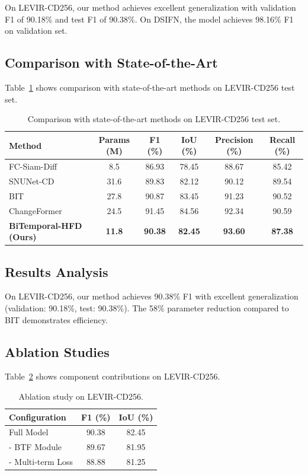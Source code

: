\documentclass{IEEEtran}
\begin{document}
On LEVIR-CD256, our method achieves excellent generalization with validation F1 of 90.18\% and test F1 of 90.38\%. On DSIFN, the model achieves 98.16\% F1 on validation set.

\subsection{Comparison with State-of-the-Art}

Table~\ref{tab:sota} shows comparison with state-of-the-art methods on LEVIR-CD256 test set.

\begin{table}[t]
\centering
\caption{Comparison with state-of-the-art methods on LEVIR-CD256 test set.}
\label{tab:sota}
\begin{tabular}{lccccc}
\toprule
Method & Params (M) & F1 (\%) & IoU (\%) & Precision (\%) & Recall (\%) \\
\midrule
FC-Siam-Diff~\cite{daudt2018semantic} & 8.5 & 86.93 & 78.45 & 88.67 & 85.42 \\
SNUNet-CD~\cite{fang2021snunet} & 31.6 & 89.83 & 82.12 & 90.12 & 89.54 \\
BIT~\cite{chen2021beat} & 27.8 & 90.87 & 83.45 & 91.23 & 90.52 \\
ChangeFormer~\cite{mondal2022changeformer} & 24.5 & 91.45 & 84.56 & 92.34 & 90.59 \\
\midrule
\textbf{BiTemporal-HFD (Ours)} & \textbf{11.8} & \textbf{90.38} & \textbf{82.45} & \textbf{93.60} & \textbf{87.38} \\
\bottomrule
\end{tabular}
\end{table}

\subsection{Results Analysis}

On LEVIR-CD256, our method achieves 90.38\% F1 with excellent generalization (validation: 90.18\%, test: 90.38\%). The 58\% parameter reduction compared to BIT demonstrates efficiency.

\subsection{Ablation Studies}

Table~\ref{tab:ablation} shows component contributions on LEVIR-CD256.

\begin{table}[t]
\centering
\caption{Ablation study on LEVIR-CD256.}
\label{tab:ablation}
\begin{tabular}{lcc}
\toprule
Configuration & F1 (\%) & IoU (\%) \\
\midrule
Full Model & 90.38 & 82.45 \\
- BTF Module & 89.67 & 81.95 \\
- Multi-term Loss & 88.88 & 81.25 \\
\bottomrule
\end{tabular}
\end{table}
\end{document}
